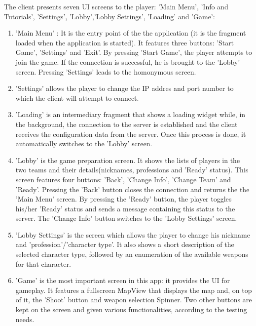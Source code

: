 The client presents seven UI screens to the player: 'Main Menu', 'Info and
Tutorials', 'Settings', 'Lobby','Lobby Settings', 'Loading' and 'Game':

\begin{enumerate}
  \item 'Main Menu' : It is the entry point of the the application (it is the
  fragment loaded when the application is started). It features three buttons:
  'Start Game', 'Settings' and 'Exit'. By pressing 'Start Game', the player
  attempts to join the game. If the connection is successful, he is brought to
  the 'Lobby' screen. Pressing 'Settings' leads to the homonymous screen.
  
  \item 'Settings' allows the player to change the IP addres and port
  number to which the client will attempt to connect.
  
  \item 'Loading' is an intermediary fragment that shows a loading widget
  while, in the background, the connection to the server is established
  and the client receives the configuration data from the server. Once
  this process is done, it automatically switches to the 'Lobby' screen.
  
  \item 'Lobby' is the game preparation screen. It shows the lists of players in
  the two teams and their details(nicknames, professions and 'Ready' status).
  This screen features four buttons: 'Back', 'Change Info', 'Change Team' and
  'Ready'. Pressing the 'Back' button closes the connection and returns the
  the 'Main Menu' screen. By pressing the 'Ready' button, the player toggles
  his/her 'Ready' status and sends a message containing this status to the
  server. The 'Change Info' button switches to the 'Lobby Settings' screen.  
  
  \item 'Lobby Settings' is the screen which allows the player to change his
  nickname and 'profession'/'character type'. It also shows a short description
  of the selected character type, followed by an enumeration of the available
  weapons for that character.
  
  \item 'Game' is the most important screen in this app: it provides the UI
  for gameplay. It features a fullscreen MapView that displays the map and, on
  top of it, the 'Shoot' button and weapon selection Spinner. Two other buttons
  are kept on the screen and given various functionalities, according to the
  testing needs.
   
\end{enumerate}

